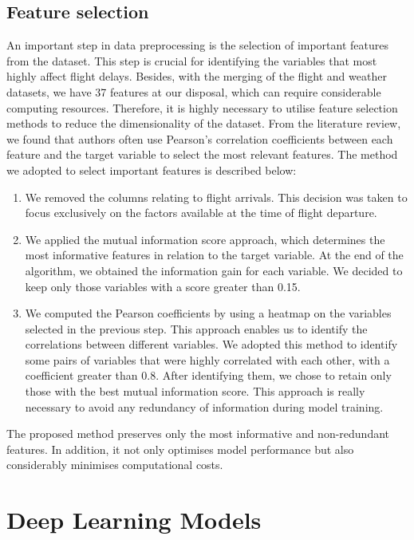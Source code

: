 \documentclass[12pt,oneside]{book} %
\begin{document}
\subsection{Feature selection}
\label{Feature selection}
\noindent An important step in data preprocessing is the selection of important features from the dataset. This step is crucial for identifying the variables that most highly affect flight delays. Besides, with the merging of the flight and weather datasets, we have 37 features at our disposal, which can require considerable computing resources. Therefore, it is highly necessary to utilise feature selection methods to reduce the dimensionality of the dataset. From the literature review, we found that authors often use Pearson's correlation coefficients between each feature and the target variable to select the most relevant features. The method we adopted to select important features is described below:

\begin{enumerate}
    \item We removed the columns relating to flight arrivals. This decision was taken to focus exclusively on the factors available at the time of flight departure.
    \item We applied the mutual information score \citep{Mutualinformation,Mutualinformation1} approach, which determines the most informative features in relation to the target variable. At the end of the algorithm, we obtained the information gain for each variable. We decided to keep only those variables with a score greater than 0.15.
    \item We computed the Pearson coefficients by using a heatmap on the variables selected in the previous step. This approach enables us to identify the correlations between different variables. We adopted this method to identify some pairs of variables that were highly correlated with each other, with a coefficient greater than 0.8. After identifying them, we chose to retain only those with the best mutual information score. This approach is really necessary to avoid any redundancy of information during model training.
\end{enumerate}

\noindent The proposed method preserves only the most informative and non-redundant features. In addition, it not only optimises model performance but also considerably minimises computational costs.

\section{Deep Learning Models}
\end{document}
